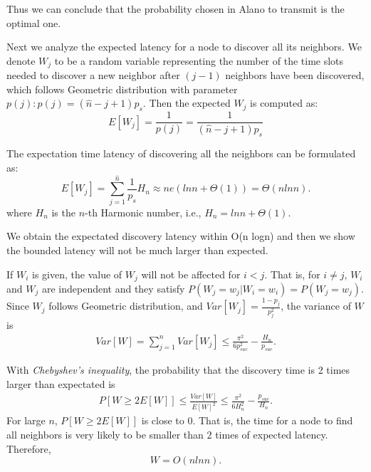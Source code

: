 Thus we can conclude that the probability chosen in Alano
to transmit is the optimal one. 

Next we analyze the expected latency for a node to discover all its 
neighbors. We denote $W_j$ to be a random variable representing the number of the time slots 
needed to discover a new neighbor after $(j-1)$ neighbors have been discovered, which follows 
Geometric distribution with parameter $p(j): p(j)=(\hat{n}-j+1)p_s$. Then the expected $W_j$ is computed as:
$$
E[W_j]=\frac{1}{p(j)}=\frac{1}{(\hat{n}-j+1)p_s}
$$

The expectation time latency of discovering all the neighbors can be formulated as:
$$
E[W_j] = \sum_{j=1}^{\hat{n}}\frac{1}{p_s}H_n \approx ne(lnn + \Theta(1)) = \Theta(nlnn).
$$
where $H_n$ is the $n$-th Harmonic number, i.e.,
$H_n = lnn + \Theta(1)$.

We obtain the expectated discovery latency within O(n logn) and then we
show the bounded latency will not be much larger than expected.

If $W_i$ is given, the value of $W_j$ will not be affected for $i<j$. That is, for $i\ne j$, $W_i$ and $W_j$ are independent and they satisfy $P(W_j=w_j|W_i=w_i)=P(W_j=w_j)$. Since $W_j$ follows Geometric distribution, and $Var[W_j]=\frac{1-p_j}{p_j^2}$, the variance of $W$ is
\begin{displaymath}
\begin{split}
 Var[W] %
 =\sum_{j=1}^{n}Var[W_j]
 \le\frac{\pi^2}{6p_{suc}^2}-\frac{H_n}{p_{suc}}.
\end{split}
\end{displaymath}

With \emph{Chebyshev's inequality}, the probability that the discovery time is 2 times larger than expectated is
\begin{displaymath}
\begin{split}
P[W\ge2E[W]]%
\le\frac{Var[W]}{E[W]^2}
\le\frac{\pi^2}{6H_{n}^2}-\frac{p_{suc}}{H_n}.
\end{split}
\end{displaymath}
For large $n$, $P[W\ge2E[W]]$ is close to 0. That is, the time for a node to find all neighbors is very likely to be smaller than $2$ times of expected latency. Therefore,
\begin{equation*}
W=O(nlnn).
\end{equation*}

